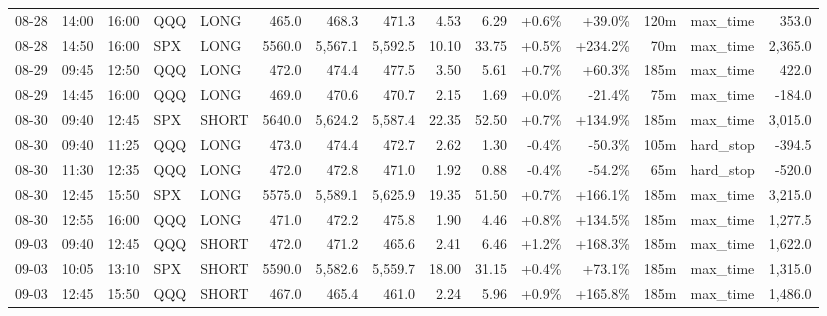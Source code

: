 \documentclass[11pt,a4paper,twoside]{article}
\begin{document}
\begin{landscape}
\begin{center}
\begin{longtable}{>{\color{txtmain}}l l l l l r r r r r r r r >{\color{txtmain}}l r}
08-28 & 14:00 & 16:00 & QQQ & LONG & 465.0 & 468.3 & 471.3 & 4.53 & 6.29 & \textcolor{wingreen}{+0.6\%} & \textcolor{wingreen}{+39.0\%} & 120m & max\_time & \textcolor{wingreen}{353.0} \\
08-28 & 14:50 & 16:00 & SPX & LONG & 5560.0 & 5,567.1 & 5,592.5 & 10.10 & 33.75 & \textcolor{wingreen}{+0.5\%} & \textcolor{wingreen}{+234.2\%} & 70m & max\_time & \textcolor{wingreen}{2,365.0} \\
08-29 & 09:45 & 12:50 & QQQ & LONG & 472.0 & 474.4 & 477.5 & 3.50 & 5.61 & \textcolor{wingreen}{+0.7\%} & \textcolor{wingreen}{+60.3\%} & 185m & max\_time & \textcolor{wingreen}{422.0} \\
08-29 & 14:45 & 16:00 & QQQ & LONG & 469.0 & 470.6 & 470.7 & 2.15 & 1.69 & \textcolor{wingreen}{+0.0\%} & \textcolor{lossred}{-21.4\%} & 75m & max\_time & \textcolor{lossred}{-184.0} \\
08-30 & 09:40 & 12:45 & SPX & SHORT & 5640.0 & 5,624.2 & 5,587.4 & 22.35 & 52.50 & \textcolor{wingreen}{+0.7\%} & \textcolor{wingreen}{+134.9\%} & 185m & max\_time & \textcolor{wingreen}{3,015.0} \\
08-30 & 09:40 & 11:25 & QQQ & LONG & 473.0 & 474.4 & 472.7 & 2.62 & 1.30 & \textcolor{lossred}{-0.4\%} & \textcolor{lossred}{-50.3\%} & 105m & hard\_stop & \textcolor{lossred}{-394.5} \\
08-30 & 11:30 & 12:35 & QQQ & LONG & 472.0 & 472.8 & 471.0 & 1.92 & 0.88 & \textcolor{lossred}{-0.4\%} & \textcolor{lossred}{-54.2\%} & 65m & hard\_stop & \textcolor{lossred}{-520.0} \\
08-30 & 12:45 & 15:50 & SPX & LONG & 5575.0 & 5,589.1 & 5,625.9 & 19.35 & 51.50 & \textcolor{wingreen}{+0.7\%} & \textcolor{wingreen}{+166.1\%} & 185m & max\_time & \textcolor{wingreen}{3,215.0} \\
08-30 & 12:55 & 16:00 & QQQ & LONG & 471.0 & 472.2 & 475.8 & 1.90 & 4.46 & \textcolor{wingreen}{+0.8\%} & \textcolor{wingreen}{+134.5\%} & 185m & max\_time & \textcolor{wingreen}{1,277.5} \\
09-03 & 09:40 & 12:45 & QQQ & SHORT & 472.0 & 471.2 & 465.6 & 2.41 & 6.46 & \textcolor{wingreen}{+1.2\%} & \textcolor{wingreen}{+168.3\%} & 185m & max\_time & \textcolor{wingreen}{1,622.0} \\
09-03 & 10:05 & 13:10 & SPX & SHORT & 5590.0 & 5,582.6 & 5,559.7 & 18.00 & 31.15 & \textcolor{wingreen}{+0.4\%} & \textcolor{wingreen}{+73.1\%} & 185m & max\_time & \textcolor{wingreen}{1,315.0} \\
09-03 & 12:45 & 15:50 & QQQ & SHORT & 467.0 & 465.4 & 461.0 & 2.24 & 5.96 & \textcolor{wingreen}{+0.9\%} & \textcolor{wingreen}{+165.8\%} & 185m & max\_time & \textcolor{wingreen}{1,486.0} \\

\end{longtable}
\end{center}
\end{landscape}
\end{document}
